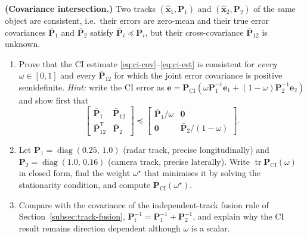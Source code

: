 \documentclass[graybox,envcountchap]{style/SNmono}
\DeclareMathOperator{\diag}{diag}
\DeclareMathOperator{\tr}{tr}
\providecommand{\DIFadd}[1]{{\protect\color{blue} #1}} %
\providecommand{\DIFaddbegin}{} %
\providecommand{\DIFaddend}{} %
\begin{document}
\begin{prob}\label{prob:ch03:8}
\textbf{(Covariance intersection.)} Two tracks $(\widehat{\mathbf{x}}_1,\mathbf{P}_1)$ and $(\widehat{\mathbf{x}}_2,\mathbf{P}_2)$ of the same object are consistent, i.e.\ their \DIFaddbegin \DIFadd{errors are zero-mean and their }\DIFaddend true error covariances $\bar{\mathbf{P}}_1$ and $\bar{\mathbf{P}}_2$ satisfy $\bar{\mathbf{P}}_i\preceq\mathbf{P}_i$, but their cross-covariance $\bar{\mathbf{P}}_{12}$ is unknown.
\begin{enumerate}
\item[(a)] Prove that the CI estimate \eqref{eq:ci-cov}--\eqref{eq:ci-est} is consistent for \emph{every} $\omega\in[0,1]$ and every $\bar{\mathbf{P}}_{12}$ for which the joint error covariance is positive semidefinite. \emph{Hint:} write the CI error as $\mathbf{e}=\mathbf{P}_{\mathrm{CI}}\left(\omega\mathbf{P}_1^{-1}\mathbf{e}_1+(1-\omega)\mathbf{P}_2^{-1}\mathbf{e}_2\right)$ and show first that
\begin{equation*}
\begin{bmatrix}\bar{\mathbf{P}}_1&\bar{\mathbf{P}}_{12}\\ \bar{\mathbf{P}}_{12}^{\mathsf T}&\bar{\mathbf{P}}_2\end{bmatrix}\preceq\begin{bmatrix}\bar{\mathbf{P}}_1/\omega&\mathbf{0}\\ \mathbf{0}&\bar{\mathbf{P}}_2/(1-\omega)\end{bmatrix}.
\end{equation*}
\item[(b)] Let $\mathbf{P}_1=\diag(0.25,\,1.0)$ (radar track, precise longitudinally) and $\mathbf{P}_2=\diag(1.0,\,0.16)$ (camera track, precise laterally). Write $\tr\mathbf{P}_{\mathrm{CI}}(\omega)$ in closed form, find the weight $\omega^{\star}$ that minimises it by solving the stationarity condition, and compute $\mathbf{P}_{\mathrm{CI}}(\omega^{\star})$.
\item[(c)] Compare with the covariance of the independent-track fusion rule of Section~\ref{subsec:track-fusion}, $\mathbf{P}_{\mathrm{f}}^{-1}=\mathbf{P}_1^{-1}+\mathbf{P}_2^{-1}$, and explain why the CI result remains direction dependent although $\omega$ is a scalar.
\end{enumerate}
\end{prob}
\end{document}
